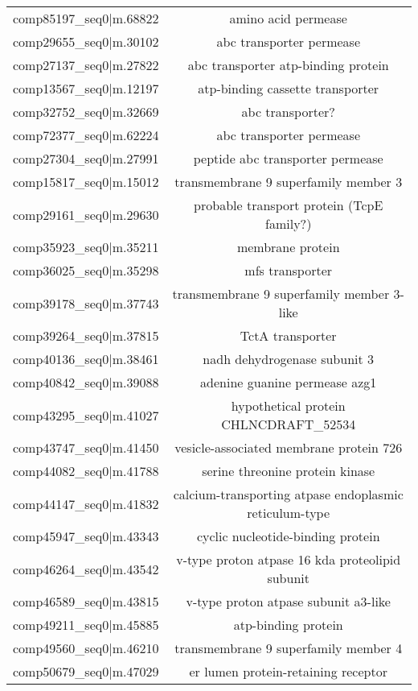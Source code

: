 \begin{table}
\begin{tabular}{|c|c|}
        comp85197\_seq0|m.68822&amino acid permease\\
        comp29655\_seq0|m.30102&abc transporter permease\\	
        comp27137\_seq0|m.27822&abc transporter atp-binding protein\\
        comp13567\_seq0|m.12197&atp-binding cassette transporter\\
        comp32752\_seq0|m.32669&abc transporter?\\
        comp72377\_seq0|m.62224&abc transporter permease\\
        comp27304\_seq0|m.27991&peptide abc transporter permease\\
        comp15817\_seq0|m.15012&transmembrane 9 superfamily member 3\\
        comp29161\_seq0|m.29630&probable transport protein (TcpE family?)\\
        comp35923\_seq0|m.35211&membrane protein\\
        comp36025\_seq0|m.35298&mfs transporter\\
        comp39178\_seq0|m.37743&transmembrane 9 superfamily member 3-like\\
        comp39264\_seq0|m.37815&TctA transporter	\\
        comp40136\_seq0|m.38461&nadh dehydrogenase subunit 3	\\
        comp40842\_seq0|m.39088&adenine guanine permease azg1\\
        comp43295\_seq0|m.41027&hypothetical protein CHLNCDRAFT\_52534\\
        comp43747\_seq0|m.41450&vesicle-associated membrane protein 726\\
        comp44082\_seq0|m.41788&serine threonine protein kinase\\
        comp44147\_seq0|m.41832&calcium-transporting atpase endoplasmic reticulum-type\\
        comp45947\_seq0|m.43343&cyclic nucleotide-binding protein\\			
        comp46264\_seq0|m.43542&v-type proton atpase 16 kda proteolipid subunit\\
        comp46589\_seq0|m.43815&v-type proton atpase subunit a3-like\\
        comp49211\_seq0|m.45885&atp-binding protein\\
        comp49560\_seq0|m.46210&transmembrane 9 superfamily member 4\\
        comp50679\_seq0|m.47029&er lumen protein-retaining receptor\\

\end{tabular}
\end{table}
